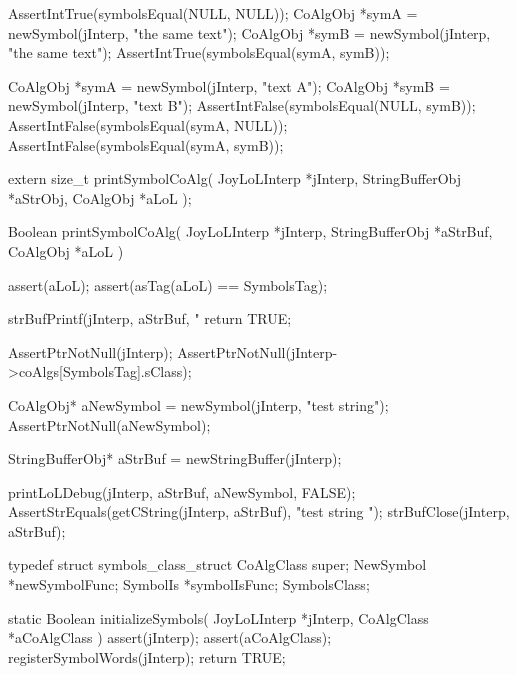 
\startCTest
  AssertIntTrue(symbolsEqual(NULL, NULL));
  CoAlgObj *symA = newSymbol(jInterp, "the same text");
  CoAlgObj *symB = newSymbol(jInterp, "the same text");
  AssertIntTrue(symbolsEqual(symA, symB));
\stopCTest
\stopTestCase


\startCTest
  CoAlgObj *symA = newSymbol(jInterp, "text A");
  CoAlgObj *symB = newSymbol(jInterp, "text B");
  AssertIntFalse(symbolsEqual(NULL, symB));
  AssertIntFalse(symbolsEqual(symA, NULL));
  AssertIntFalse(symbolsEqual(symA, symB));
\stopCTest
\stopTestCase
\stopTestSuite



\startCHeader
extern size_t printSymbolCoAlg(
  JoyLoLInterp    *jInterp,
  StringBufferObj *aStrObj,
  CoAlgObj        *aLoL
);
\stopCHeader
{}

\startCCode
Boolean printSymbolCoAlg(
  JoyLoLInterp    *jInterp,
  StringBufferObj *aStrBuf,
  CoAlgObj        *aLoL
) {
  assert(aLoL);
  assert(asTag(aLoL) == SymbolsTag);

  strBufPrintf(jInterp, aStrBuf, "%
  return TRUE;
}
\stopCCode


\startCTest
  AssertPtrNotNull(jInterp);
  AssertPtrNotNull(jInterp->coAlgs[SymbolsTag].sClass);

  CoAlgObj* aNewSymbol = newSymbol(jInterp, "test string");
  AssertPtrNotNull(aNewSymbol);
  
  StringBufferObj* aStrBuf = newStringBuffer(jInterp);
  
  printLoLDebug(jInterp, aStrBuf, aNewSymbol, FALSE);
  AssertStrEquals(getCString(jInterp, aStrBuf),
    "test string ");
  strBufClose(jInterp, aStrBuf);
\stopCTest
\stopTestCase
\stopTestSuite

\startTestSuite[registerSymbols]

\startCHeader
typedef struct symbols_class_struct {
  CoAlgClass  super;
  NewSymbol  *newSymbolFunc;
  SymbolIs   *symbolIsFunc;
} SymbolsClass;
\stopCHeader

\startCCode
static Boolean initializeSymbols(
  JoyLoLInterp *jInterp,
  CoAlgClass   *aCoAlgClass
) {
  assert(jInterp);
  assert(aCoAlgClass);
  registerSymbolWords(jInterp);
  return TRUE;
}
\stopCCode

